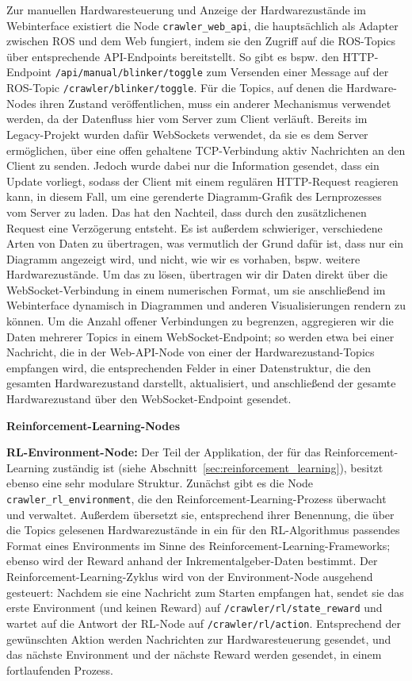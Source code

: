 Zur manuellen Hardwaresteuerung und Anzeige der Hardwarezustände im Webinterface existiert die Node \texttt{crawler\_web\_api}, die hauptsächlich als Adapter zwischen ROS und dem Web fungiert, indem sie den Zugriff auf die ROS-Topics über entsprechende API-Endpoints bereitstellt. So gibt es bspw. den HTTP-Endpoint \texttt{/api/manual/blinker/toggle} zum Versenden einer Message auf der ROS-Topic \texttt{/crawler/blinker/toggle}. Für die Topics, auf denen die Hardware-Nodes ihren Zustand veröffentlichen, muss ein anderer Mechanismus verwendet werden, da der Datenfluss hier vom Server zum Client verläuft. Bereits im Legacy-Projekt wurden dafür WebSockets verwendet, da sie es dem Server ermöglichen, über eine offen gehaltene TCP-Verbindung aktiv Nachrichten an den Client zu senden. Jedoch wurde dabei nur die Information gesendet, dass ein Update vorliegt, sodass der Client mit einem regulären HTTP-Request reagieren kann, in diesem Fall, um eine gerenderte Diagramm-Grafik des Lernprozesses vom Server zu laden. Das hat den Nachteil, dass durch den zusätzlichenen Request eine Verzögerung entsteht. Es ist außerdem schwieriger, verschiedene Arten von Daten zu übertragen, was vermutlich der Grund dafür ist, dass nur ein Diagramm angezeigt wird, und nicht, wie wir es vorhaben, bspw. weitere Hardwarezustände. Um das zu lösen, übertragen wir dir Daten direkt über die WebSocket-Verbindung in einem numerischen Format, um sie anschließend im Webinterface dynamisch in Diagrammen und anderen Visualisierungen rendern zu können. Um die Anzahl offener Verbindungen zu begrenzen, aggregieren wir die Daten mehrerer Topics in einem WebSocket-Endpoint; so werden etwa bei einer Nachricht, die in der Web-API-Node von einer der Hardwarezustand-Topics empfangen wird, die entsprechenden Felder in einer Datenstruktur, die den gesamten Hardwarezustand darstellt, aktualisiert, und anschließend der gesamte Hardwarezustand über den WebSocket-Endpoint gesendet. 

\textbf{Reinforcement-Learning-Nodes}

\textbf{RL-Environment-Node:} Der Teil der Applikation, der für das Reinforcement-Learning zuständig ist (siehe Abschnitt~\ref{sec:reinforcement_learning}), besitzt ebenso eine sehr modulare Struktur. Zunächst gibt es die Node \texttt{crawler\_rl\_environment}, die den Reinforcement-Learning-Prozess überwacht und verwaltet. Außerdem übersetzt sie, entsprechend ihrer Benennung, die über die Topics gelesenen Hardwarezustände in ein für den RL-Algorithmus passendes Format eines Environments im Sinne des Reinforcement-Learning-Frameworks; ebenso wird der Reward anhand der Inkrementalgeber-Daten bestimmt. Der Reinforcement-Learning-Zyklus wird von der Environment-Node ausgehend gesteuert: Nachdem sie eine Nachricht zum Starten empfangen hat, sendet sie das erste Environment (und keinen Reward) auf \texttt{/crawler/rl/state\_reward} und wartet auf die Antwort der RL-Node auf \texttt{/crawler/rl/action}. Entsprechend der gewünschten Aktion werden Nachrichten zur Hardwaresteuerung gesendet, und das nächste Environment und der nächste Reward werden gesendet, in einem fortlaufenden Prozess. 

